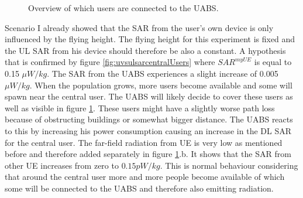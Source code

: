 \begin{figure}[!htb]
\hfill
{}
\caption{Overview of which users are connected to the \acs{UABS}.}
  \label{fig:connectionMap}
\end{figure}

Scenario I already showed that the \gls{SAR} from the user's own device is only influenced by the flying height. 
The flying height for this experiment is fixed and the \gls{UL} \gls{SAR} from his device should therefore be also a constant. 
A hypothesis that is confirmed by figure \ref{fig:uvsulsarcentralUsers} where $SAR^{myUE}$ is equal to 0.15 $\mu W/kg$.
The \gls{SAR} from the \gls{UABS} experiences a slight increase of 0.005 $\mu W/kg$. When the population grows, more users become available 
and some will spawn near the central user. The \gls{UABS} will likely decide to cover these users as well as visible in figure \ref{fig:connectionMap}.
These users might have a slightly 
worse path loss because of obstructing buildings or somewhat bigger distance. The \gls{UABS} reacts to this by increasing 
his power consumption causing an increase in the \gls{DL} \gls{SAR} for the central user.
The far-field radiation from \gls{UE} is very low as mentioned before and therefore added separately in figure \ref{fig:connectionMap}.b.
It shows that the \gls{SAR}  from other \gls{UE} increases from zero to $0.15 pW/kg$. This is normal 
behaviour considering that around the central user more and more people become available of which some will be connected to the \gls{UABS}
and therefore also emitting radiation.


